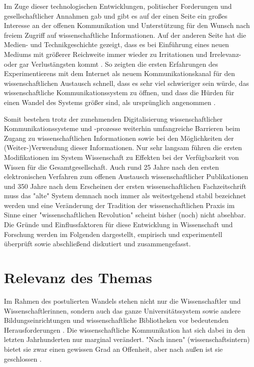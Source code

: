 Im Zuge dieser technologischen Entwicklungen, politischer Forderungen und gesellschaftlicher Annahmen gab und gibt es auf der einen Seite ein großes Interesse an der offenen Kommunikation und Unterstützung für den Wunsch nach freiem Zugriff auf wissenschaftliche Informationen. Auf der anderen Seite hat die Medien- und Technikgeschichte gezeigt, dass es bei Einführung eines neuen Mediums mit größerer Reichweite immer wieder zu Irritationen \cite{Naeder_2010} und Irrelevanz- oder gar Verlustängsten kommt \cite{Hagner_2015}. So zeigten die ersten Erfahrungen des Experimentierens mit dem Internet als neuem Kommunikationskanal für den wissenschaftlichen Austausch schnell, dass es sehr viel schwieriger sein würde, das wissenschaftliche Kommunikationssystem zu öffnen, und dass die Hürden für einen Wandel des Systems größer sind, als ursprünglich angenommen \cite{Bjoerk_2004}.

Somit bestehen trotz der zunehmenden Digitalisierung wissenschaftlicher Kommunikationssysteme und -prozesse weiterhin umfangreiche Barrieren beim Zugang zu wissenschaftlichen Informationen sowie bei den Möglichkeiten der (Weiter-)Verwendung dieser Informationen. Nur sehr langsam führen die ersten Modifikationen im System Wissenschaft zu Effekten bei der Verfügbarkeit von Wissen für die Gesamtgesellschaft. Auch rund 25 Jahre nach den ersten elektronischen Verfahren zum offenen Austausch wissenschaftlicher Publikationen \cite{Albert_2006} und 350 Jahre nach dem Erscheinen der ersten wissenschaftlichen Fachzeitschrift \cite{Moxham_2015} muss das "alte" System demnach noch immer als weitestgehend stabil bezeichnet werden \cite{Brembs_2015} \cite{Hanekop_2014} \cite{Warnke_2012} und eine Veränderung der Tradition der wissenschaftlichen Praxis im Sinne einer "wissenschaftlichen Revolution" \cite{Kuhn_2012} scheint bisher (noch) nicht absehbar. Die Gründe und Einflussfaktoren für diese Entwicklung in Wissenschaft und Forschung werden im Folgenden dargestellt, empirisch und experimentell überprüft sowie abschließend diskutiert und zusammengefasst.

\section{Relevanz des Themas}

Im Rahmen des postulierten Wandels stehen nicht nur die Wissenschaftler und Wissenschaftlerinnen, sondern auch das ganze Universitätssystem sowie andere Bildungseinrichtungen und wissenschaftliche Bibliotheken vor bedeutenden Herausforderungen \cite{Mueller_2010} \cite{Harter_2006} \cite{Guedon_2004} \cite{Osterloh_2008} \cite{Beverungen_2014}. Die wissenschaftliche Kommunikation hat sich dabei in den letzten Jahrhunderten nur marginal verändert. "Nach innen" (wissenschaftsintern) bietet sie zwar einen gewissen Grad an Offenheit, aber nach außen ist sie geschlossen \cite{Kelty_2004}.

